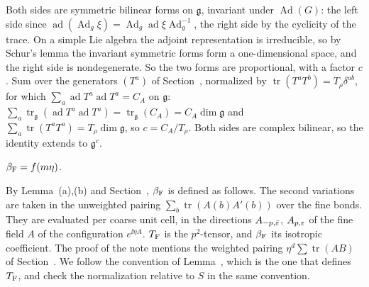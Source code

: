 \begin{step}[Proof]
Both sides are symmetric bilinear forms on $\mathfrak g$, invariant under $\operatorname{Ad}(G)$: the left side since $\operatorname{ad}(\operatorname{Ad}_g\xi)=\operatorname{Ad}_g\operatorname{ad}\xi\operatorname{Ad}_g^{-1}$, the right side by the cyclicity of the trace. On a simple Lie algebra the adjoint representation is irreducible, so by Schur's lemma the invariant symmetric forms form a one-dimensional space, and the right side is nondegenerate. So the two forms are proportional, with a factor $c$. Sum over the generators $(T^a)$ of Section~, normalized by $\operatorname{tr}(T^aT^b)=T_\rho\delta^{ab}$, for which $\sum_a\operatorname{ad}T^a\operatorname{ad}T^a=C_A$ on $\mathfrak g$: $\sum_a\operatorname{tr}_{\mathfrak g}(\operatorname{ad}T^a\operatorname{ad}T^a)=\operatorname{tr}_{\mathfrak g}(C_A)=C_A\dim\mathfrak g$ and $\sum_a\operatorname{tr}(T^aT^a)=T_\rho\dim\mathfrak g$, so $c=C_A/T_\rho$. Both sides are complex bilinear, so the identity extends to $\mathfrak g^c$.
\end{step}

\begin{detail}\label{d11b:ol-scaling}
$\beta_{\rm F}=f(m\eta)$.
\end{detail}

\begin{step}
By Lemma~(a),(b) and Section~, $\beta_{\rm F}$ is defined as follows. The second variations are taken in the unweighted pairing $\sum_b\operatorname{tr}(A(b)A'(b))$ over the fine bonds. They are evaluated per coarse unit cell, in the directions $A_{-p,\bar{\varepsilon}}$, $A_{p,\varepsilon}$ of the fine field $A$ of the configuration $e^{\ii\eta A}$. $T_{\rm F}$ is the $p^2$-tensor, and $\beta_{\rm F}$ its isotropic coefficient. The proof of the note mentions the weighted pairing $\eta^d\sum\operatorname{tr}(AB)$ of Section~. We follow the convention of Lemma~, which is the one that defines $T_{\rm F}$, and check the normalization relative to $S$ in the same convention.
\end{step}


